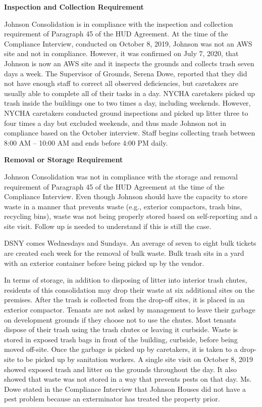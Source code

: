 
\textbf{Inspection and Collection Requirement}

Johnson Consolidation is in compliance with the inspection and collection requirement of Paragraph 45 of the HUD Agreement. At the time of the Compliance Interview, conducted on October 8, 2019, Johnson was not an AWS site and not in compliance. However, it was confirmed on July 7, 2020, that Johnson is now an AWS site and it inspects the grounds and collects trash seven days a week. The Supervisor of Grounds, Serena Dowe, reported that they did not have enough staff to correct all observed deficiencies, but caretakers are usually able to complete all of their tasks in a day. NYCHA caretakers picked up trash inside the buildings one to two times a day, including weekends. However, NYCHA caretakers conducted ground inspections and picked up litter three to four times a day but excluded weekends, and thus made Johnson not in compliance based on the October interview. Staff begins collecting trash between 8:00 AM -- 10:00 AM and ends before 4:00 PM daily.

\textbf{Removal or Storage Requirement}

Johnson Consolidation was not in compliance with the storage and removal requirement of Paragraph 45 of the HUD Agreement at the time of the Compliance Interview. Even though Johnson should have the capacity to store waste in a manner that prevents waste (e.g., exterior compactors, trash bins, recycling bins), waste was not being properly stored based on self-reporting and a site visit. Follow up is needed to understand if this is still the case. 

DSNY comes Wednesdays and Sundays. An average of seven to eight bulk tickets are created each week for the removal of bulk waste. Bulk trash sits in a yard with an exterior container before being picked up by the vendor.

In terms of storage, in addition to disposing of litter into interior trash chutes, residents of this consolidation may drop their waste at six additional sites on the premises. After the trash is collected from the drop-off sites, it is placed in an exterior compactor. Tenants are not asked by management to leave their garbage on development grounds if they choose not to use the chutes. Most tenants dispose of their trash using the trash chutes or leaving it curbside. Waste is stored in exposed trash bags in front of the building, curbside, before being moved off-site. Once the garbage is picked up by caretakers, it is taken to a drop-site to be picked up by sanitation workers. A single site visit on October 8, 2019 showed exposed trash and litter on the grounds throughout the day. It also showed that waste was not stored in a way that prevents pests on that day. Ms. Dowe stated in the Compliance Interview that Johnson Houses did not have a pest problem because an exterminator has treated the property prior.

